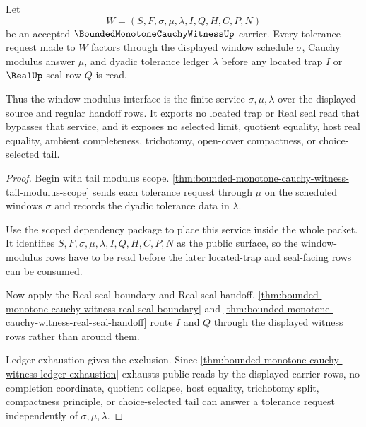 \begin{theorem}
\label{thm:bounded-monotone-cauchy-witness-window-modulus-row-scope}
Let
$$
W=(S,F,\sigma,\mu,\lambda,I,Q,H,C,P,N)
$$
be an accepted $\BoundedMonotoneCauchyWitnessUp$ carrier. Every tolerance request made to $W$ factors through the displayed window schedule $\sigma$, Cauchy modulus answer $\mu$, and dyadic tolerance ledger $\lambda$ before any located trap $I$ or $\RealUp$ seal row $Q$ is read.

Thus the window-modulus interface is the finite service $\sigma,\mu,\lambda$ over the displayed source and regular handoff rows. It exports no located trap or Real seal read that bypasses that service, and it exposes no selected limit, quotient equality, host real equality, ambient completeness, trichotomy, open-cover compactness, or choice-selected tail.
\end{theorem}
\begin{proof}
Begin with tail modulus scope. \autoref{thm:bounded-monotone-cauchy-witness-tail-modulus-scope} sends each tolerance request through $\mu$ on the scheduled windows $\sigma$ and records the dyadic tolerance data in $\lambda$.

Use the scoped dependency package to place this service inside the whole packet. It identifies $S,F,\sigma,\mu,\lambda,I,Q,H,C,P,N$ as the public surface, so the window-modulus rows have to be read before the later located-trap and seal-facing rows can be consumed.

Now apply the Real seal boundary and Real seal handoff. \autoref{thm:bounded-monotone-cauchy-witness-real-seal-boundary} and \autoref{thm:bounded-monotone-cauchy-witness-real-seal-handoff} route $I$ and $Q$ through the displayed witness rows rather than around them.

Ledger exhaustion gives the exclusion. Since \autoref{thm:bounded-monotone-cauchy-witness-ledger-exhaustion} exhausts public reads by the displayed carrier rows, no completion coordinate, quotient collapse, host equality, trichotomy split, compactness principle, or choice-selected tail can answer a tolerance request independently of $\sigma,\mu,\lambda$.
\end{proof}

